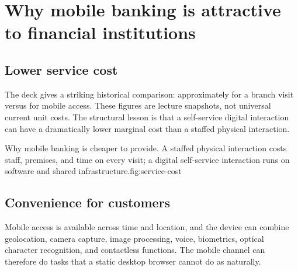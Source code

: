 \section{Why mobile banking is attractive to financial institutions}

\subsection{Lower service cost}

The deck gives a striking historical comparison: approximately  for a branch visit versus  for mobile access. These figures are lecture snapshots, not universal current unit costs. The structural lesson is that a self-service digital interaction can have a dramatically lower marginal cost than a staffed physical interaction.

\begin{utpfig}{Why mobile banking is cheaper to provide. A staffed physical interaction costs staff, premises, and time on every visit; a digital self-service interaction runs on software and shared infrastructure.}{fig:service-cost}
\end{utpfig}

\subsection{Convenience for customers}

Mobile access is available across time and location, and the device can combine geolocation, camera capture, image processing, voice, biometrics, optical character recognition, and contactless functions. The mobile channel can therefore do tasks that a static desktop browser cannot do as naturally.

